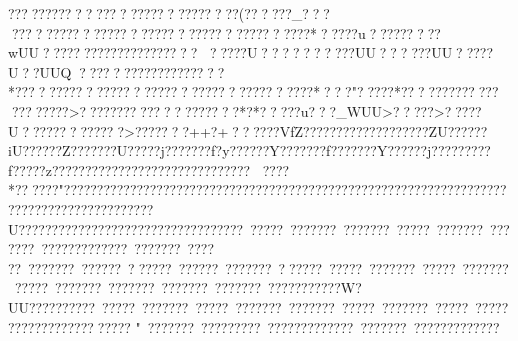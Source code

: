{{{{{{{{{{{{{{{{{{{{{{{{{{{{{{{{{{{{{{{{{{{{{{{{{{{{{{{{{{{{{{{{{{{{{{{{{{{{{{{{{{{{{{{{{{{{{{{{{{{{{{{{{{{{{{{{{{{{{{{{{{{{{{{{{{{{{{{{{{{{{{{{{{{{{{{{{{{{{{{{{{{{{{{{{{{{{{{{{{{{{{{{{{{{{{{{{{{{{{{{{{{{{{{{{{{{{{{{{{{{{{{{{{{{{{{{{{{{{{{{{{{{{{{{{{{{{{{{{{{{{{{{{{{{{{{{{{{{{{{{{{{{{{{{{{{{{{{{{{{{{{{{{{{{{{{{{{{{{{{{{{{{{{{{{{{{{{{{{{{{{{{{{{{{{{{{{{{{{{{{{{{{{{{{{{{{{{{{{{{{{{{{{{{{{{{{{{{{{{{{{{{{{{{{{{{{{{{{{{{{{{{{{{{{{{{{{{{{{{{{{{{{{{{{{{{{{{{{{{{{{{{{{{{{{{{{{{{{{{{{{{{{{{{{{{{{{{{{{{{{{{{{{{{{{{{{{{{{{{{{{{{{{{{{{{{{{{{{{{{{{{{{{{{{{{{{{{{{{{{{{{{{{{{{{{{{{{{{{{{{{{{{{{{{{{{{{{{{{{{{{{{{{{{{{{{{{{{{{{{{{{{{{{{{{{{{{{{{{{{{{{{{{{{{{{{{{{{{{{{{{{{{{{{{{{{{{{{{{{{{{{{{{{{{{{{{{{{{{{{{{{{{{{{{{{{{{{{{{{{{{{{{{{{{{{{{{{{{{{{{{{{{{{{{{{{{{{{{{{{{{{{{{{{{{{{{{{{{{{{{{{{{{{{{{{{{{{{{{{{{{{{{{{{{{{{{{{{{{{{{{{{{{{{{{{{{{{{{{{{{{{{{{{{{{{{{{{{{{{{{{{{{{{{{{{{{{{{{{{{{{{{{{{{{{{{{{{{{{{{{{{{{{{{{{{{{{{{{{{{{{{{{{{{{{{{{{{{{{{{{{{{{{{{{{{{{{{{{{{{{{{{{{{{{{{{{{{{{{{{{{{{{{{{{{{{{{{{{{{{{{{{{{{{{{{{{{{{{{{{{{{{{{{{{{{{{{{{{{{{{{{{{{{{{{{{{{{{{{{{{{{{{{{{{{{{{{{{{{{{{{{{{{{{{{{{{{{{{{{{{{{{{{{{{{{{{{{{{{{{{{{{{{{{{{{{{{{{{{{{{{{{{{{{{{{{{{{{{{{{{{{{{{{{{{{{{{{{{{{{{{{{{{{{{{{{{{{{{{{{{{{{{{{{{{{{{{{{{{{{{{{{{{{{{{{{{{{{{{{{{{{{{{{{{{{{{{{{{{{{{{{{{{{{{{{{{{{{{{{{{{{{{{{{{{{{{{{{{{{{{{{{{{{{{{{{{{{{{{{{{{{{{{{{{{{{{{{{{{{{{{{{{{{{{{{{{{{{{{{{{{{{{{{{{{{{{{{{{{{{{{{{{{{{{{{{{{{{{{{{{{{{{{{{{{{{{{{{{{{{{{{{{{{{{{{{{{{{{{{{{{{{{{{{{{{{{{{{{{{{{{{{{{{{{{{{{{{{{{{{{{{{{{{{{{{{{{{{{{{{{{{{{{{{{{{{{{{{{{{{{{{{{{{{{{{{{{{{{{{{{{{{{{{{{{{{{{{{{{{{{{{{{{{{{{{{{{{{{{{{{{{{{{{{{{{{{{{{{{{{{{{{{{{{{{{{{{{{{{{{{{{{{{{{{{{{{{{{{{{{{{{{{{{{{{{{{{{{{{{{{{{{{{{{{{{{{{{{{{{{{{{{{{{{{{{{{{{{{{{{{{{{{{{{{{{{{{{{{{{{{{{{{{{{{{{{{{{{{{{{{{{{{{{{{{{{{{{{??????? ??????????????????????(??????_?????????????????????????????????????????*?????u?????????wUU?????????????????????
  ?????U??    ??    ??    ????UU??    ????UU?????U??UUQ???????????????????*??????????????????????????????????????*???"?????*?????????????????????>????????????????????*?*?????u???_WUU>?????>?????U?????????????>???????++?+??   ????VfZ?????    ??????????????ZU??????iU??????Z???????U?????j???????f?y??????Y???????f???????Y??????j?????????f?????z?????????????????????????????? ????*??????   "????  ??????  ?????? ?????????????????????????????????????????????????????????????????????????U??????????????????????????????????~?????~???????~???????~?????~???????~???????~?????????????~???????~????
??~???????~? ?????~??????~? ?????~???????~??????~?????~???????~?????~???????~?????~???????~???????~???????~???????~???????????W?UU??????????~?????~???????~?????~???????~???????~?????~???????~?????~??????????????????????? 
" ~???????~?????????~?????????????~???????~????????????? }}}}}}}}}}}}}}}}}}}}}}}}}}}}}}}}}}}}}}}}}}}}}}}}}}}}}}}}}}}}}}}}}}}}}}}}}}}}}}}}}}}}}}}}}}}}}}}}}}}}}}}}}}}}}}}}}}}}}}}}}}}}}}}}}}}}}}}}}}}}}}}}}}}}}}}}}}}}}}}}}}}}}}}}}}}}}}}}}}}}}}}}}}}}}}}}}}}}}}}}}}}}}}}}}}}}}}}}}}}}}}}}}}}}}}}}}}}}}}}}}}}}}}}}}}}}}}}}}}}}}}}}}}}}}}}}}}}}}}}}}}}}}}}}}}}}}}}}}}}}}}}}}}}}}}}}}}}}}}}}}}}}}}}}}}}}}}}}}}}}}}}}}}}}}}}}}}}}}}}}}}}}}}}}}}}}}}}}}}}}}}}}}}}}}}}}}}}}}}}}}}}}}}}}}}}}}}}}}}}}}}}}}}}}}}}}}}}}}}}}}}}}}}}}}}}}}}}}}}}}}}}}}}}}}}}}}}}}}}}}}}}}}}}}}}}}}}}}}}}}}}}}}}}}}}}}}}}}}}}}}}}}}}}}}}}}}}}}}}}}}}}}}}}}}}}}}}}}}}}}}}}}}}}}}}}}}}}}}}}}}}}}}}}}}}}}}}}}}}}}}}}}}}}}}}}}}}}}}}}}}}}}}}}}}}}}}}}}}}}}}}}}}}}}}}}}}}}}}}}}}}}}}}}}}}}}}}}}}}}}}}}}}}}}}}}}}}}}}}}}}}}}}}}}}}}}}}}}}}}}}}}}}}}}}}}}}}}}}}}}}}}}}}}}}}}}}}}}}}}}}}}}}}}}}}}}}}}}}}}}}}}}}}}}}}}}}}}}}}}}}}}}}}}}}}}}}}}}}}}}}}}}}}}}}}}}}}}}}}}}}}}}}}}}}}}}}}}}}}}}}}}}}}}}}}}}}}}}}}}}}}}}}}}}}}}}}}}}}}}}}}}}}}}}}}}}}}}}}}}}}}}}}}}}}}}}}}}}}}}}}}}}}}}}}}}}}}}}}}}}}}}}}}}}}}}}}}}}}}}}}}}}}}}}}}}}}}}}}}}}}}}}}}}}}}}}}}}}}}}}}}}}}}}}}}}}}}}}}}}}}}}}}}}}}}}}}}}}}}}}}}}}}}}}}}}}}}}}}}}}}}}}}}}}}}}}}}}}}}}}}}}}}}}}}}}}}}}}}}}}}}}}}}}}}}}}}}}}}}}}}}}}}}}}}}}}}}}}}}}}}}}}}}}}}}}}}}}}}}}}}}}}}}}}}}}}}}}}}}}}}}}}}}}}}}}}}}}}}}}}}}}}}}}}}}}}}}}}}}}}}}}}}}}}}}}}}}}}}}}}}}}}}}}}}}}}}}}}}}}}}}}}}}}}}}}}}}}}}}}}}}}}}}}}}}}}}}}}}}}}}}}}}}}}}}}}}}}}}}}}}}}}}}}}}}}}}}}}}}}}}}}}}}}}}}}}}}}}}}}}}}}}}}}}}}}}}}}}}}}}}}}}}}}}}}}}}}}}}}}}}}}}}}}}}}}}}}}}}}}}}}}}}}}}}}}}}}}}}}}}}}}}}}}}}}}}}}}}}}}}}}}}}}}}}}}}}}}}}}}}}}}}}}}}}}}}}}}}}}}}}}}}}}}}}}}}}}}}}}}}}}}}}}}}}}}}}}}}}}}}}}}}}}}}}}}}}}}}}}}}}}}}}}}}}}}}}}}}}}}}}}}}}}}}}}}}}}}}}}}}}}}}}}}}}}}}}}}}}}}}}}}}}}}}}}}}}}}}}}}}}}}}}}}}}}}}}}}}}}}}}}}}}}}}}}}}}}}}}}}}}}}}}}}}}}}}}}}}}}}}}}}}}}}}}}}}}}}}}}}}}}}}}}}}}}}}}}}
